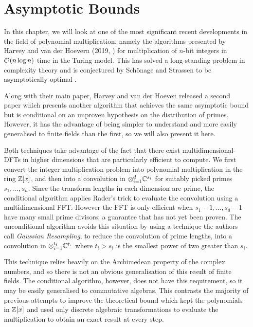 \chapter{Asymptotic Bounds}\label{chp:asymptotic}

In this chapter, we will look at one of the most significant recent developments in the field of polynomial multiplication, namely the algorithms presented by Harvey and van der Hoevern (2019, \cite{nlogn}) for multiplication of $n$-bit integers in $\mathcal O(n \log n)$ time in the Turing model. This has solved a long-standing problem in complexity theory and is conjectured by Sch\"{o}nage and Strassen to be asymptotically optimal \cite{sch-str-optimality-int-mult}.

\medskip

Along with their main paper, Harvey and van der Hoeven released a second paper \cite{ffnlogn} which presents another algorithm that achieves the same asymptotic bound but is conditional on an unproven hypothesis on the distribution of primes. However, it has the advantage of being simpler to understand and more easily generalised to finite fields than the first, so we will also present it here.

\medskip


Both techniques take advantage of the fact that there exist multidimensional-DFTs in higher dimensions that are particularly efficient to compute. We first convert the integer multiplication problem into polynomial multiplication in the ring ${\mathbb Z}[x]$, and then into a convolution in $\otimes_{i=1}^d {\mathbb C}^{s_i}$ for suitably picked primes $s_1, \ldots, s_n$. Since the transform lengths in each dimension are prime, the conditional algorithm applies Rader's trick to evaluate the convolution using a multidimensional FFT. However the FFT is only efficient when $s_1 - 1, \ldots, s_d - 1$ have many small prime divisors; a guarantee that has not yet been proven. The unconditional algorithm avoids this situation by using a technique the authors call \emph{Gaussian Resampling}, to reduce the convolution of prime lengths, into a convolution in $\otimes_{i=1}^{t_i} {\mathbb C}^{t_i}$ where $t_i > s_i$ is the smallest power of two greater than $s_i$.

This technique relies heavily on the Archimedean property of the complex numbers, and so there is not an obvious generalisation of this result of finite fields. The conditional algorithm, however, does not have this requirement, so it may be easily generalised to commutative algebras. This contrasts the majority of previous attempts to improve the theoretical bound which kept the polynomials in ${\mathbb Z}[x]$ and used only discrete algebraic transformations to evaluate the multiplication to obtain an exact result at every step.

